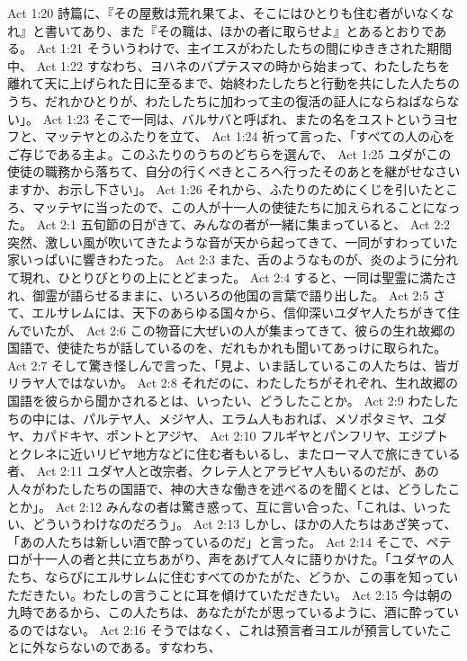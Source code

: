 Act 1:20  詩篇に、『その屋敷は荒れ果てよ、そこにはひとりも住む者がいなくなれ』と書いてあり、また『その職は、ほかの者に取らせよ』とあるとおりである。
Act 1:21  そういうわけで、主イエスがわたしたちの間にゆききされた期間中、
Act 1:22  すなわち、ヨハネのバプテスマの時から始まって、わたしたちを離れて天に上げられた日に至るまで、始終わたしたちと行動を共にした人たちのうち、だれかひとりが、わたしたちに加わって主の復活の証人にならねばならない」。
Act 1:23  そこで一同は、バルサバと呼ばれ、またの名をユストというヨセフと、マッテヤとのふたりを立て、
Act 1:24  祈って言った、「すべての人の心をご存じである主よ。このふたりのうちのどちらを選んで、
Act 1:25  ユダがこの使徒の職務から落ちて、自分の行くべきところへ行ったそのあとを継がせなさいますか、お示し下さい」。
Act 1:26  それから、ふたりのためにくじを引いたところ、マッテヤに当ったので、この人が十一人の使徒たちに加えられることになった。
Act 2:1  五旬節の日がきて、みんなの者が一緒に集まっていると、
Act 2:2  突然、激しい風が吹いてきたような音が天から起ってきて、一同がすわっていた家いっぱいに響きわたった。
Act 2:3  また、舌のようなものが、炎のように分れて現れ、ひとりびとりの上にとどまった。
Act 2:4  すると、一同は聖霊に満たされ、御霊が語らせるままに、いろいろの他国の言葉で語り出した。
Act 2:5  さて、エルサレムには、天下のあらゆる国々から、信仰深いユダヤ人たちがきて住んでいたが、
Act 2:6  この物音に大ぜいの人が集まってきて、彼らの生れ故郷の国語で、使徒たちが話しているのを、だれもかれも聞いてあっけに取られた。
Act 2:7  そして驚き怪しんで言った、「見よ、いま話しているこの人たちは、皆ガリラヤ人ではないか。
Act 2:8  それだのに、わたしたちがそれぞれ、生れ故郷の国語を彼らから聞かされるとは、いったい、どうしたことか。
Act 2:9  わたしたちの中には、パルテヤ人、メジヤ人、エラム人もおれば、メソポタミヤ、ユダヤ、カパドキヤ、ポントとアジヤ、
Act 2:10  フルギヤとパンフリヤ、エジプトとクレネに近いリビヤ地方などに住む者もいるし、またローマ人で旅にきている者、
Act 2:11  ユダヤ人と改宗者、クレテ人とアラビヤ人もいるのだが、あの人々がわたしたちの国語で、神の大きな働きを述べるのを聞くとは、どうしたことか」。
Act 2:12  みんなの者は驚き惑って、互に言い合った、「これは、いったい、どういうわけなのだろう」。
Act 2:13  しかし、ほかの人たちはあざ笑って、「あの人たちは新しい酒で酔っているのだ」と言った。
Act 2:14  そこで、ペテロが十一人の者と共に立ちあがり、声をあげて人々に語りかけた。「ユダヤの人たち、ならびにエルサレムに住むすべてのかたがた、どうか、この事を知っていただきたい。わたしの言うことに耳を傾けていただきたい。
Act 2:15  今は朝の九時であるから、この人たちは、あなたがたが思っているように、酒に酔っているのではない。
Act 2:16  そうではなく、これは預言者ヨエルが預言していたことに外ならないのである。すなわち、
